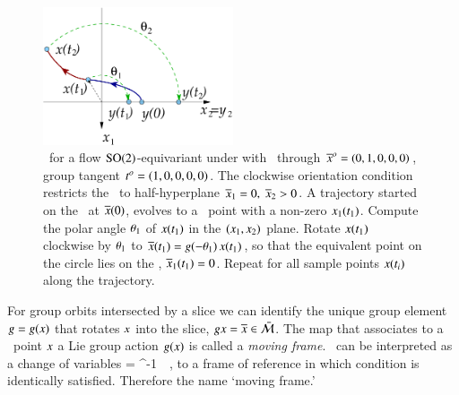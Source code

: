 \begin{figure}[ht]
 \begin{center}
  \includegraphics[width=0.5\textwidth]{../figs/ESunrot}
 \end{center}
 \label{fig:ESunrot}
 \caption{\Mframes\ for a flow $\textrm{SO}(2)$-equivariant under
 with \slice\ through ${\overline{x}^o}=(0,1,0,0,0)$,
group tangent $t^o_{}=(1,0,0,0,0)$. The clockwise
orientation condition restricts the \slice\ to half-hyperplane
$\overline{x}_1=0,\;\overline{x}_2>0$. A trajectory started on the
\slice\ at $\overline{x}(0)$, evolves to a \statesp\ point with a
non-zero $x_1(t_1)$. Compute the polar angle ${\bf \theta}_1$
of $x(t_1)$ in the $(x_1,x_2)$ plane. Rotate $x(t_1)$
clockwise by ${\bf \theta}_1$ to $\overline{x}(t_1) =
g(-{\bf \theta}_1)\,x(t_1)$, so that the equivalent point
on the circle lies on the \slice, $\overline{x}_1(t_1) =0$. Repeat
for all sample points $x(t_i)$ along the trajectory.}
\end{figure}



For group orbits intersected by a slice we can identify the unique group element
$g=g(x)$ that rotates $x$ into the slice,
$gx = \overline{x} \in \bar{\cal M}$. The map that
associates to a \statesp\ point $x$ a Lie group action
$g(x)$ is called a \emph{moving frame}. \Mframes\
can be interpreted as a change of variables
\beq
\sspRed = \LieEl^{-1} \, \ssp
\,,
to a frame of reference in which condition
 is identically satisfied. Therefore the name
`moving frame.'



